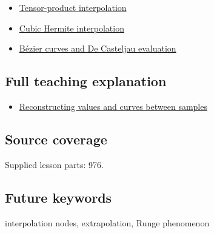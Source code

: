\begin{itemize}
\tightlist
\item
  \hyperref[appendix-0a09b6dfdc86]{Tensor-product interpolation}
\item
  \hyperref[appendix-db3aef8f2fd6]{Cubic Hermite interpolation}
\item
  \hyperref[appendix-ddbec701898c]{Bézier curves and De Casteljau evaluation}
\end{itemize}

\subsection{Full teaching explanation}\label{full-teaching-explanation}

\begin{itemize}
\tightlist
\item
  \href{Continuous\%20Notes/Computing\%20Foundations\%20-\%20From\%20Bits\%20to\%20C++\%20and\%20Systems\%20APIs\#Reconstructing\%20values\%20and\%20curves\%20between\%20samples}{Reconstructing values and curves between samples}
\end{itemize}

\subsection{Source coverage}\label{source-coverage}

Supplied lesson parts: 976.

\subsection{Future keywords}\label{future-keywords}

interpolation nodes, extrapolation, Runge phenomenon
